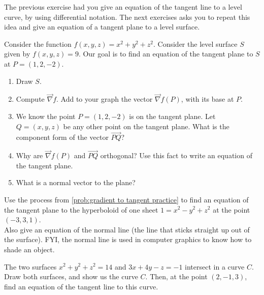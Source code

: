 The previous exercise had you give an equation of the tangent line to a level curve, by using differential notation.  The next exercises asks you to repeat this idea and give an equation of a tangent plane to a level surface.



\begin{problem}\label{prob:gradient to tangent practice}
 Consider the function $f(x,y,z)=x^2+y^2+z^2$.  Consider the level surface $S$ given by $f(x,y,z)=9$. Our goal is to find an equation of the tangent plane to $S$ at $P=(1,2,-2)$.
 \begin{enumerate}
  \item Draw $S$.
  \item Compute $\vec \nabla f$. Add to your graph the vector $\vec \nabla f(P)$, with its base at $P$. 
  \item We know the point $P=(1,2,-2)$ is on the tangent plane. Let $Q=(x,y,z)$ be any other point on the tangent plane.  What is the component form of the vector $\vec {PQ}$?
  \item Why are  $\vec \nabla f(P)$ and $\vec{PQ}$ orthogonal? Use this fact to write an equation of the tangent plane.
  \item What is a normal vector to the plane?
 \end{enumerate}
\end{problem}

\begin{problem}
Use the process from \ref{prob:gradient to tangent practice} to find an equation of the tangent plane to the hyperboloid of one sheet $1=x^2-y^2+z^2$ at the point $(-3,3,1)$. \\

Also give an equation of the normal line (the line that sticks straight up out of the surface).  FYI, the normal line is used in computer graphics to know how to shade an object.  
\end{problem}

\begin{challenge}
The two surfaces $x^2+y^2+z^2=14$ and $3x+4y-z=-1$ intersect in a curve $C$. Draw both surfaces, and show us the curve $C$. Then, at the point $(2,-1,3)$, find an equation of the tangent line to this curve.
\end{challenge}

